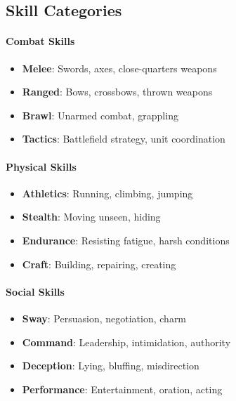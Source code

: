 \begin{multicols}{2}
\subsection*{Skill Categories}

\paragraph{Combat Skills}
\begin{itemize}
\item \textbf{Melee}: Swords, axes, close-quarters weapons
\item \textbf{Ranged}: Bows, crossbows, thrown weapons
\item \textbf{Brawl}: Unarmed combat, grappling
\item \textbf{Tactics}: Battlefield strategy, unit coordination
\end{itemize}

\paragraph{Physical Skills}
\begin{itemize}
\item \textbf{Athletics}: Running, climbing, jumping
\item \textbf{Stealth}: Moving unseen, hiding
\item \textbf{Endurance}: Resisting fatigue, harsh conditions
\item \textbf{Craft}: Building, repairing, creating
\end{itemize}

\paragraph{Social Skills}
\begin{itemize}
\item \textbf{Sway}: Persuasion, negotiation, charm
\item \textbf{Command}: Leadership, intimidation, authority
\item \textbf{Deception}: Lying, bluffing, misdirection
\item \textbf{Performance}: Entertainment, oration, acting
\end{itemize}


\end{multicols}
